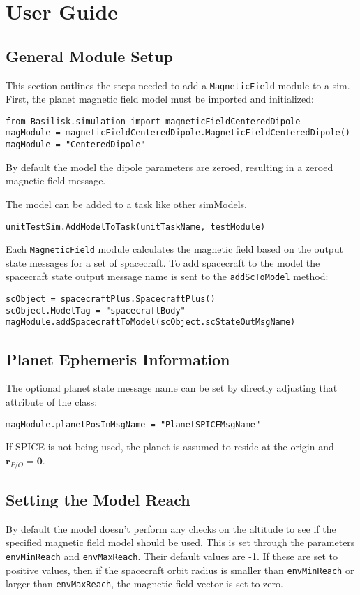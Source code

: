 
\section{User Guide}

\subsection{General Module Setup}
This section outlines the steps needed to add a {\tt MagneticField} module to a sim.
First, the planet magnetic field model must be imported and initialized:
\begin{verbatim}
from Basilisk.simulation import magneticFieldCenteredDipole
magModule = magneticFieldCenteredDipole.MagneticFieldCenteredDipole()
magModule = "CenteredDipole"
\end{verbatim}
By default the model the dipole parameters are zeroed, resulting in a zeroed magnetic field message. 

The model can  be added to a task like other simModels. 
\begin{verbatim}
unitTestSim.AddModelToTask(unitTaskName, testModule)
\end{verbatim}

Each {\tt MagneticField} module calculates the magnetic field based on the output state messages for a set of spacecraft.
To add spacecraft to the model the spacecraft state output message name is sent to the \verb|addScToModel| method:
\begin{verbatim}
scObject = spacecraftPlus.SpacecraftPlus()
scObject.ModelTag = "spacecraftBody"
magModule.addSpacecraftToModel(scObject.scStateOutMsgName)
\end{verbatim}

\subsection{Planet Ephemeris Information}
The optional planet state message name can be set by directly adjusting that attribute of the class:
\begin{verbatim}
magModule.planetPosInMsgName = "PlanetSPICEMsgName"
\end{verbatim}
If SPICE is not being used, the planet is assumed to reside at the origin and $\bm r_{P/O} = \bm 0$.

\subsection{Setting the Model Reach}
By default the model doesn't perform any checks on the altitude to see if the specified magnetic field model should be used.  This is set through the parameters {\tt envMinReach} and {\tt envMaxReach}.  Their default values are -1.  If these are set to positive values, then if the spacecraft orbit radius is smaller than {\tt envMinReach} or larger than {\tt envMaxReach}, the magnetic field vector is set to zero.



